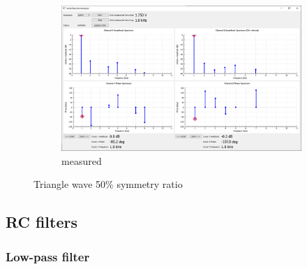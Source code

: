 \documentclass[notitlepage, a4paper, 11pt]{article}
\begin{document}
\begin{figure}[H]
\begin{subfigure}[][][t]{0.3\textwidth}
			\includegraphics[width=\textwidth, trim=10 80 555 100, clip]{../img/Circuit1/trig50}
			\caption{measured}
			\label{fig:meas-signal-a}
		\end{subfigure}
		\caption{Triangle wave 50\% symmetry ratio}
		\label{fig:pure-sin}
	\end{figure}
		
	\subsection{RC filters}
	
	\subsubsection{Low-pass filter}
\end{document}
